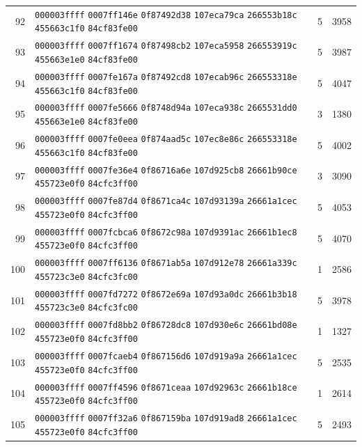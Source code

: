\begin{longtable}{@{}r p{12cm} r r@{}}
92 & \texttt{000003ffff} \texttt{0007ff146e} \texttt{0f87492d38} \texttt{107eca79ca} \texttt{266553b18c} \texttt{455663c1f0} \texttt{84cf83fe00} & 5 & 3958 \\
93 & \texttt{000003ffff} \texttt{0007ff1674} \texttt{0f87498cb2} \texttt{107eca5958} \texttt{266553919c} \texttt{455663e1e0} \texttt{84cf83fe00} & 5 & 3987 \\
94 & \texttt{000003ffff} \texttt{0007fe167a} \texttt{0f87492cd8} \texttt{107ecab96c} \texttt{266553318e} \texttt{455663c1f0} \texttt{84cf83fe00} & 5 & 4047 \\
95 & \texttt{000003ffff} \texttt{0007fe5666} \texttt{0f8748d94a} \texttt{107eca938c} \texttt{2665531dd0} \texttt{455663e1e0} \texttt{84cf83fe00} & 3 & 1380 \\
96 & \texttt{000003ffff} \texttt{0007fe0eea} \texttt{0f874aad5c} \texttt{107ec8e86c} \texttt{266553318e} \texttt{455663c1f0} \texttt{84cf83fe00} & 5 & 4002 \\
97 & \texttt{000003ffff} \texttt{0007fe36e4} \texttt{0f86716a6e} \texttt{107d925cb8} \texttt{26661b90ce} \texttt{455723e0f0} \texttt{84cfc3ff00} & 3 & 3090 \\
98 & \texttt{000003ffff} \texttt{0007fe87d4} \texttt{0f8671ca4c} \texttt{107d93139a} \texttt{26661a1cec} \texttt{455723e0f0} \texttt{84cfc3ff00} & 5 & 4053 \\
99 & \texttt{000003ffff} \texttt{0007fcbca6} \texttt{0f8672c98a} \texttt{107d9391ac} \texttt{26661b1ec8} \texttt{455723e0f0} \texttt{84cfc3ff00} & 5 & 4070 \\
100 & \texttt{000003ffff} \texttt{0007ff6136} \texttt{0f8671ab5a} \texttt{107d912e78} \texttt{26661a339c} \texttt{455723c3e0} \texttt{84cfc3fc00} & 1 & 2586 \\
101 & \texttt{000003ffff} \texttt{0007fd7272} \texttt{0f8672e69a} \texttt{107d93a0dc} \texttt{26661b3b18} \texttt{455723c3e0} \texttt{84cfc3fc00} & 5 & 3978 \\
102 & \texttt{000003ffff} \texttt{0007fd8bb2} \texttt{0f86728dc8} \texttt{107d930e6c} \texttt{26661bd08e} \texttt{455723e0f0} \texttt{84cfc3ff00} & 1 & 1327 \\
103 & \texttt{000003ffff} \texttt{0007fcaeb4} \texttt{0f867156d6} \texttt{107d919a9a} \texttt{26661a1cec} \texttt{455723e0f0} \texttt{84cfc3ff00} & 5 & 2535 \\
104 & \texttt{000003ffff} \texttt{0007ff4596} \texttt{0f8671ceaa} \texttt{107d92963c} \texttt{26661b18ce} \texttt{455723e0f0} \texttt{84cfc3ff00} & 1 & 2614 \\
105 & \texttt{000003ffff} \texttt{0007ff32a6} \texttt{0f867159ba} \texttt{107d919ad8} \texttt{26661a1cec} \texttt{455723e0f0} \texttt{84cfc3ff00} & 5 & 2493 \\

\end{longtable}
